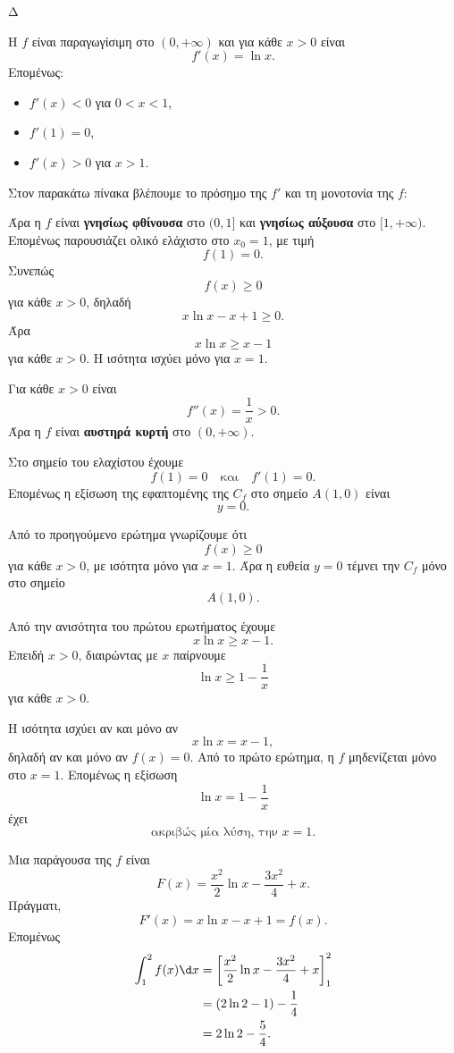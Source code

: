 \begin{thema}{Δ}
\begin{erwthma}
\item Η $f$ είναι παραγωγίσιμη στο $(0,+\infty)$ και για κάθε $x>0$ είναι
\[
f'(x)=\ln x.
\]
Επομένως:
\begin{itemize}
\item $f'(x)<0$ για $0<x<1$,
\item $f'(1)=0$,
\item $f'(x)>0$ για $x>1$.
\end{itemize}
Στον παρακάτω πίνακα βλέπουμε το πρόσημο της $f'$ και τη μονοτονία της $f$:
\begin{center}
\end{center}

Άρα η $f$ είναι \textbf{γνησίως φθίνουσα} στο $(0,1]$ και \textbf{γνησίως αύξουσα} στο $[1,+\infty)$. Επομένως παρουσιάζει ολικό ελάχιστο στο $x_0=1$, με τιμή
\[
{f(1)=0}.
\]
Συνεπώς
\[
f(x)\geq0
\]
για κάθε $x>0$, δηλαδή
\[
x\ln x-x+1\geq0.
\]
Άρα
\[
{x\ln x\geq x-1}
\]
για κάθε $x>0$. Η ισότητα ισχύει μόνο για $x=1$.

\item Για κάθε $x>0$ είναι
\[
f''(x)=\frac{1}{x}>0.
\]
Άρα η $f$ είναι \textbf{αυστηρά κυρτή} στο $(0,+\infty)$.

Στο σημείο του ελαχίστου έχουμε
\[
f(1)=0
\quad\text{και}\quad
f'(1)=0.
\]
Επομένως η εξίσωση της εφαπτομένης της $C_f$ στο σημείο $A(1,0)$ είναι
\[
{y=0}.
\]

Από το προηγούμενο ερώτημα γνωρίζουμε ότι
\[
f(x)\geq0
\]
για κάθε $x>0$, με ισότητα μόνο για $x=1$. Άρα η ευθεία $y=0$ τέμνει την $C_f$ μόνο στο σημείο
\[
{A(1,0)}.
\]

\item Από την ανισότητα του πρώτου ερωτήματος έχουμε
\[
x\ln x\geq x-1.
\]
Επειδή $x>0$, διαιρώντας με $x$ παίρνουμε
\[
{\ln x\geq1-\frac{1}{x}}
\]
για κάθε $x>0$.

Η ισότητα ισχύει αν και μόνο αν
\[
x\ln x=x-1,
\]
δηλαδή αν και μόνο αν $f(x)=0$. Από το πρώτο ερώτημα, η $f$ μηδενίζεται μόνο στο $x=1$. Επομένως η εξίσωση
\[
\ln x=1-\frac{1}{x}
\]
έχει
\[
{\text{ακριβώς μία λύση, την }x=1}.
\]

\item Μια παράγουσα της $f$ είναι
\[
F(x)=\frac{x^2}{2}\ln x-\frac{3x^2}{4}+x.
\]
Πράγματι,
\[
F'(x)=x\ln x-x+1=f(x).
\]
Επομένως
\begin{align*}
\int_1^2f(x)\d x
&=\left[
\frac{x^2}{2}\ln x-\frac{3x^2}{4}+x
\right]_1^2\\
&=\left(2\ln2-1\right)-\frac14\\
&={2\ln2-\frac54}.
\end{align*}
\end{erwthma}
\end{thema}

